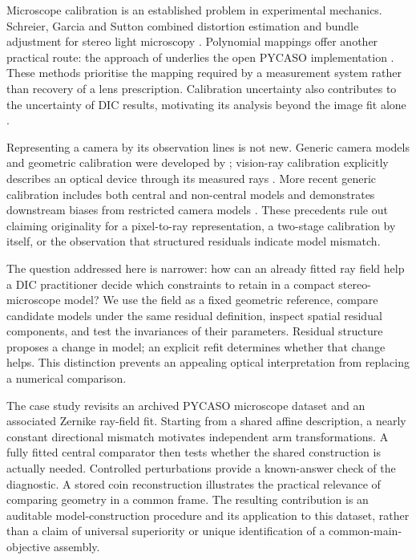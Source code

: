 \documentclass[10pt,a4paper]{article}
\begin{document}
Microscope calibration is an established problem in experimental mechanics. Schreier, Garcia and Sutton combined distortion estimation and bundle adjustment for stereo light microscopy \citep{schreier2004}. Polynomial mappings offer another practical route: the approach of \citet{soloff1997} underlies the open PYCASO implementation \citep{pycaso2023}. These methods prioritise the mapping required by a measurement system rather than recovery of a lens prescription. Calibration uncertainty also contributes to the uncertainty of DIC results, motivating its analysis beyond the image fit alone \citep{reu2013}.

Representing a camera by its observation lines is not new. Generic camera models and geometric calibration were developed by \citet{grossberg2001,sturm2004}; vision-ray calibration explicitly describes an optical device through its measured rays \citep{bothe2010}. More recent generic calibration includes both central and non-central models and demonstrates downstream biases from restricted camera models \citep{schops2020}. These precedents rule out claiming originality for a pixel-to-ray representation, a two-stage calibration by itself, or the observation that structured residuals indicate model mismatch.

The question addressed here is narrower: how can an already fitted ray field help a DIC practitioner decide which constraints to retain in a compact stereo-microscope model? We use the field as a fixed geometric reference, compare candidate models under the same residual definition, inspect spatial residual components, and test the invariances of their parameters. Residual structure proposes a change in model; an explicit refit determines whether that change helps. This distinction prevents an appealing optical interpretation from replacing a numerical comparison.

The case study revisits an archived PYCASO microscope dataset and an associated Zernike ray-field fit. Starting from a shared affine description, a nearly constant directional mismatch motivates independent arm transformations. A fully fitted central comparator then tests whether the shared construction is actually needed. Controlled perturbations provide a known-answer check of the diagnostic. A stored coin reconstruction illustrates the practical relevance of comparing geometry in a common frame. The resulting contribution is an auditable model-construction procedure and its application to this dataset, rather than a claim of universal superiority or unique identification of a common-main-objective assembly.
\end{document}
